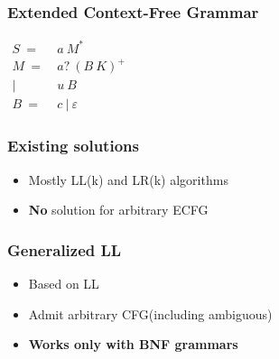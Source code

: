 \documentclass{beamer}
\begin{document}
	\begin{frame} 
		\frametitle{Extended Context-Free Grammar}
		\begin{center}
			{$\begin{aligned}
				S\ =&\ a\ M^* \\
				M\ =&\ a?\ (B\ K)^+ \\
				|&\ u\ B \\
				B\ =&\ c\ |\ \varepsilon
				\end{aligned}$}
		\end{center}
		
		

	\end{frame}

	\begin{frame} 
		\frametitle{Existing solutions} 
		\begin{itemize}
			\item Mostly LL(k) and LR(k) algorithms
			\item \textbf{No} solution for arbitrary ECFG
		\end{itemize}

	\end{frame}
	
	\begin{frame} 
		\frametitle{Generalized LL}
		\begin{itemize}
			\item<1-> Based on LL
			\item<1-> Admit arbitrary CFG(including ambiguous)
			\item<2-> \textbf{Works only with BNF grammars}
		\end{itemize}

	\end{frame}
\end{document}
